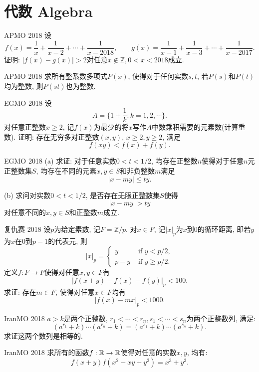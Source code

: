 \chapter{代数 Algebra}

\begin{problem}{APMO 2018}
	设$$f(x) = \frac{1}{x} + \frac{1}{x-2} + \cdots + \frac{1}{x-2018}, \qquad g(x) = \frac{1}{x-1} + \frac{1}{x-3} + \cdots + \frac{1}{x-2017}.$$
	证明: $|f(x)-g(x)|>2$对任意$x \notin \mathbb{Z},0<x<2018$成立. 
\end{problem}

\begin{problem}{APMO 2018}
	求所有整系数多项式$P(x)$, 使得对于任何实数$s,t$, 若$P(s)$和$P(t)$均为整数, 则$P(st)$也为整数. 
\end{problem}

\begin{problem}{EGMO 2018}
	设$$A = \big\{1+\frac{1}{k}:k = 1,2,\cdots  \big\}.$$
	对任意正整数$x \geq 2$, 记$f(x)$为最少的将$x$写作$A$中数乘积需要的元素数(计算重数). 证明: 存在无穷多对正整数$(x,y)$, $x \geq 2,y \geq 2$, 满足$$f(xy)<f(x)+f(y). $$
\end{problem}

\begin{problem}{EGMO 2018}
	(a) 求证: 对于任意实数$0<t<1/2$, 均存在正整数$n$使得对于任意$n$元正整数集$S$, 均存在不同的元素$x,y \in S$和非负整数$m$满足$$|x-my|\leq ty. $$
	
	(b) 求问对实数$0<t<1/2$, 是否存在无限正整数集$S$使得$$|x-my|>ty$$对任意不同的$x,y \in S$和正整数$m$成立. 
\end{problem}

\begin{problem}{复仇赛 2018}
	设$p$为给定素数, 记$F=\mathbb{Z}/p$. 对$x \in F$, 记$|x|_p$为$x$到$0$的循环距离, 即若$y$为$x$在$0$到$p-1$的代表元, 则$$|x|_p = \begin{cases}
 y & \text{ if } y<p/2, \\
 p-y & \text{ if } y \geq p/2.
\end{cases}$$
定义$f:F \to F$使得对任意$x,y \in F$有$$|f(x+y) - f(x) - f(y)|_p < 100.$$
求证: 存在$m \in F$, 使得对任意$x \in F$均有$$|f(x)-mx|_p <1000.$$
\end{problem}

\begin{problem}{IranMO 2018}
	$a>k$是两个正整数, $r_1<\cdots <r_n, s_1 < \cdots <s_n$为两个正整数列, 满足: $$(a^{r_1}+k) \cdots (a^{r_n}+k) = (a^{s_1}+k) \cdots (a^{s_n}+k).$$
	求证这两个数列是相等的. 
\end{problem}

\begin{problem}{IranMO 2018}
	求所有的函数$f:\mathbb{R} \to \mathbb{R}$使得对任意的实数$x,y$, 均有: $$f(x+y)f(x^2-xy+y^2)=x^3+y^3.$$
\end{problem}





























